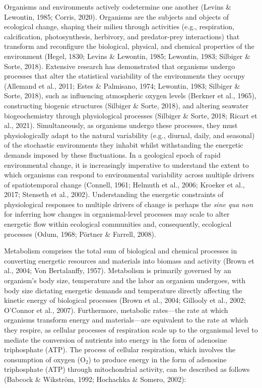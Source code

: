 \documentclass{CSUNthesis}
\begin{document}
Organisms and environments actively codetermine one another (Levins \& Lewontin, 1985; Corris, 2020). Organisms are the subjects and objects of ecological change, shaping their milieu through activities (e.g., respiration, calcification, photosynthesis, herbivory, and predator-prey interactions) that transform and reconfigure the biological, physical, and chemical properties of the environment (Hegel, 1830; Levins \& Lewontin, 1985; Lewontin, 1983; Silbiger \& Sorte, 2018). Extensive research has demonstrated that organisms undergo processes that alter the statistical variability of the environments they occupy (Allemand et al., 2011; Estes \& Palmisano, 1974; Lewontin, 1983; Silbiger \& Sorte, 2018), such as influencing atmospheric oxygen levels (Berkner et al., 1965), constructing biogenic structures (Silbiger \& Sorte, 2018), and altering seawater biogeochemistry through physiological processes (Silbiger \& Sorte, 2018; Ricart et al., 2021). Simultaneously, as organisms undergo these processes, they must physiologically adapt to the natural variability (e.g., diurnal, daily, and seasonal) of the stochastic environments they inhabit whilst withstanding the energetic demands imposed by these fluctuations. In a geological epoch of rapid environmental change, it is increasingly imperative to understand the extent to which organisms can respond to environmental variability across multiple drivers of spatiotemporal change (Connell, 1961; Helmuth et al., 2006; Kroeker et al., 2017; Stenseth et al., 2002). Understanding the energetic constraints of physiological responses to multiple drivers of change is perhaps the \textit{sine qua non} for inferring how changes in organismal-level processes may scale to alter energetic flow within ecological communities and, consequently, ecological processes (Odum, 1968; Pörtner \& Farrell, 2008).

Metabolism comprises the total sum of biological and chemical processes in converting energetic resources and materials into biomass and activity (Brown et al., 2004; Von Bertalanffy, 1957). Metabolism is primarily governed by an organism's body size, temperature and the labor an organism undergoes, with body size dictating energetic demands and temperature directly affecting the kinetic energy of biological processes (Brown et al., 2004; Gillooly et al., 2002; O'Connor et al., 2007). Furthermore, metabolic rates---the rate at which organisms transform energy and materials---are equivalent to the rate at which they respire, as cellular processes of respiration scale up to the organismal level to mediate the conversion of nutrients into energy in the form of adenosine triphosphate (ATP). The process of cellular respiration, which involves the consumption of oxygen (O\(_2\)) to produce energy in the form of adenosine triphosphate (ATP) through mitochondrial activity, can be described as follows (Babcock \& Wikström, 1992; Hochachka \& Somero, 2002):
\end{document}
